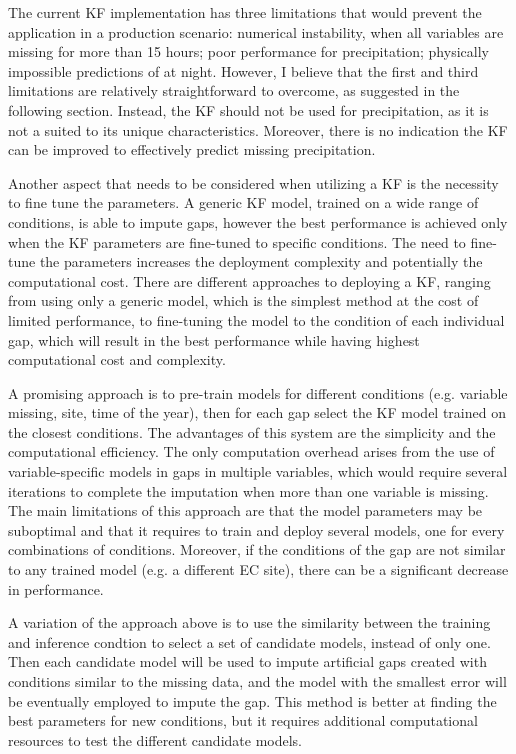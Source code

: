 \documentclass{article}
\begin{document}
The current KF implementation has three limitations that would prevent the application in a production scenario: numerical instability, when all variables are missing for more than 15 hours; poor performance for precipitation; physically impossible predictions of  at night. However, I believe that the first and third limitations are relatively straightforward to overcome, as suggested in the following section. Instead, the KF should not be used for precipitation, as it is not a suited to its unique characteristics. Moreover, there is no indication the KF can be improved to effectively predict missing precipitation.

Another aspect that needs to be considered when utilizing a KF is the necessity to fine tune the parameters.
A generic KF model, trained on a wide range of conditions, is able to impute gaps, however the best performance is achieved only when the KF parameters are fine-tuned to specific conditions.
The need to fine-tune the parameters increases the deployment complexity and potentially the computational cost.
There are different approaches to deploying a KF, ranging from using only a generic model, which is the simplest method at the cost of limited performance, to fine-tuning the model to the condition of each individual gap, which will result in the best performance while having highest computational cost and complexity.

A promising approach is to pre-train models for different conditions (e.g. variable missing, site, time of the year), then for each gap select the KF model trained on the closest conditions. The advantages of this system are the simplicity and the computational efficiency. The  only computation overhead arises from the use of variable-specific models in gaps in multiple variables, which would require several iterations to complete the imputation when more than one variable is missing.
The main limitations of this approach are that the model parameters may be suboptimal and that it requires to train and deploy several models, one for every combinations of conditions.
Moreover, if the conditions of the gap are not similar to any trained model (e.g. a different EC site), there can be a significant decrease in performance. 

A variation of the approach above is to use the similarity between the training and inference condtion to select a set of candidate models, instead of only one. Then each candidate model will be used to impute artificial gaps created with conditions similar to the missing data, and the model with the smallest error will be eventually employed to impute the gap. This method is better at finding the best parameters for new conditions, but it requires additional computational resources to test the different candidate models.
\end{document}

